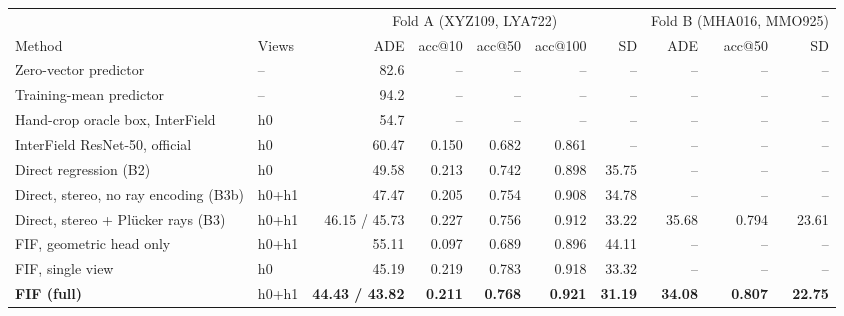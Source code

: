 \begin{tabular}{@{}llrrrrrrrr@{}}
\toprule
 & & \multicolumn{5}{c}{Fold A (XYZ109, LYA722)} & \multicolumn{3}{c}{Fold B (MHA016, MMO925)} \\
\cmidrule(lr){3-7}\cmidrule(lr){8-10}
Method & Views & ADE & acc@10 & acc@50 & acc@100 & SD & ADE & acc@50 & SD \\
\midrule
Zero-vector predictor & -- & 82.6 & -- & -- & -- & -- & -- & -- & -- \\
Training-mean predictor & -- & 94.2 & -- & -- & -- & -- & -- & -- & -- \\
Hand-crop oracle box, InterField~\cite{rim2026show3dapi} & h0 & 54.7 & -- & -- & -- & -- & -- & -- & -- \\
InterField ResNet-50, official~\cite{rim2026show3dapi} & h0 & 60.47 & 0.150 & 0.682 & 0.861 & -- & -- & -- & -- \\
\midrule
Direct regression (B2) & h0 & 49.58 & 0.213 & 0.742 & 0.898 & 35.75 & -- & -- & -- \\
Direct, stereo, no ray encoding (B3b) & h0+h1 & 47.47 & 0.205 & 0.754 & 0.908 & 34.78 & -- & -- & -- \\
Direct, stereo + Pl\"ucker rays (B3) & h0+h1 & 46.15 / 45.73 & 0.227 & 0.756 & 0.912 & 33.22 & 35.68 & 0.794 & 23.61 \\
\midrule
FIF, geometric head only & h0+h1 & 55.11 & 0.097 & 0.689 & 0.896 & 44.11 & -- & -- & -- \\
FIF, single view & h0 & 45.19 & 0.219 & 0.783 & 0.918 & 33.32 & -- & -- & -- \\
\textbf{FIF (full)} & h0+h1 & \textbf{44.43 / 43.82} & \textbf{0.211} & \textbf{0.768} & \textbf{0.921} & \textbf{31.19} & \textbf{34.08} & \textbf{0.807} & \textbf{22.75} \\
\bottomrule
\end{tabular}
